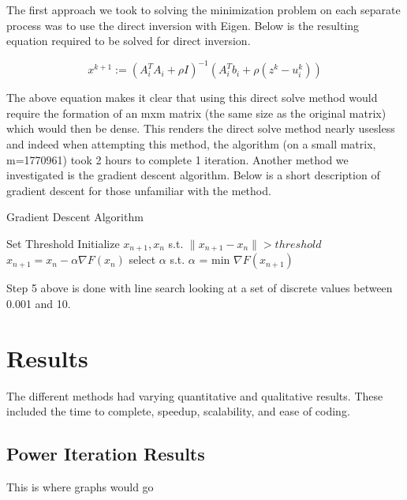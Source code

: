\documentclass[letterpaper,11pt,onecolumn]{article}
\begin{document}
The first approach we took to solving the minimization problem on each separate process was to use the direct inversion with Eigen. Below is the resulting equation required to be solved for direct inversion.
\begin{center}
  \begin{equation}
	x^{k+1} := (A_{i}^{T}A_{i} + \rho I)^{-1}(A_{i}^{T}b_{i} + \rho(z^{k} - u_{i}^{k}))
	\label{}
  \end{equation}
\end{center}
The above equation makes it clear that using this direct solve method would require the formation of an mxm matrix (the same size as the original matrix) which would then be dense. This renders the direct solve method nearly usesless and indeed when attempting this method, the algorithm (on a small matrix, m=1770961) took 2 hours to complete 1 iteration.
\newline
\linebreak
Another method we investigated is the gradient descent algorithm. Below is a short description of gradient descent for those unfamiliar with the method.

\begin{center}
  \begin{algorithm}
	\caption{Gradient Descent Algorithm}
	\begin{algorithmic}[1]
	  \STATE Set Threshold
	  \STATE Initialize $x_{n+1}, x_{n}$ s.t. $\|x_{n+1} - x_{n}\| > threshold$
	  \STATE $x_{n+1} = x_{n} - \alpha \nabla F(x_{n})$
	  \STATE select $\alpha$  s.t. $\alpha$ = min $\nabla F(x_{n+1})$
	  \ENDWHILE
	\end{algorithmic}
  \end{algorithm}
\end{center}
Step 5 above is done with line search looking at a set of discrete values between 0.001 and 10.

\section{Results}
The different methods had varying quantitative and qualitative results. These included the time to complete, speedup, scalability, and ease of coding. 

\subsection{Power Iteration Results}
This is where graphs would go 
\end{document}
